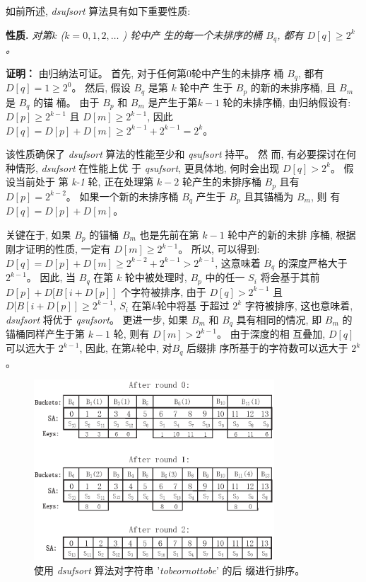 如前所述, \emph{dsufsort} 算法具有如下重要性质:


\textbf{性质.} \emph{对第$k$ \emph{(}$k = 0,1,2,\dots$ \emph{)} 轮中产
  生的每一个未排序的桶 $B_q$, 都有 $D[q] \geq 2^k$。}


\textbf{证明：} 由归纳法可证。 首先, 对于任何第0轮中产生的未排序
桶 $B_q$, 都有 $D[q] = 1 \geq 2^0$。  然后, 假设 $B_q$ 是第 $k$ 轮中产
生于 $B_p$ 的新的未排序桶, 且 $B_m$ 是 $B_q$ 的锚
桶。 由于 $B_p$ 和 $B_m$ 是产生于第$k-1$ 轮的未排序桶, 由归纳假设有:
$D[p] \geq 2^{k-1}$ 且 $D[m] \geq 2^{k-1}$, 因此
$D[q] = D[p] + D[m] \geq 2^{k-1} + 2^{k-1} = 2^k$。


该性质确保了 \emph{dsufsort} 算法的性能至少和 \emph{qsufsort} 持平。 然
而, 有必要探讨在何种情形, \emph{dsufsort} 在性能上优
于 \emph{qsufsort}, 更具体地, 何时会出现 $D[q] > 2^k$。 假设当前处于
第 \emph{k-1} 轮, 正在处理第 $k-2$ 轮产生的未排序桶 $B_p$ 且有 $D[p] =
2^{k-2}$。 如果一个新的未排序桶 $B_q$ 产生于 $B_p$ 且其锚桶为 $B_m$, 则
有 $D[q] = D[p] + D[m]$。

关键在于, 如果 $B_p$ 的锚桶 $B_m$ 也是先前在第 $k-1$ 轮中产的新的未排
序桶, 根据刚才证明的性质, 一定有 $D[m] \geq 2^{k-1}$。 所以, 可以得到:
$D[q] = D[p] + D[m] \geq 2^{k-2} + 2^{k-1} > 2^{k-1}$, 这意味着 $B_q$
的深度严格大于 $2^{k-1}$。 因此, 当 $B_q$ 在第 $k$ 轮中被处理时, $B_p$
中的任一 $S_i$ 将会基于其前 $D[p] + D[B[i+D[p]]$ 个字符被排序, 由于
$D[q] > 2^{k-1}$ 且 $D[B[i+D[p]] \geq 2^{k-1}$, $S_i$ 在第$k$轮中将基
于超过 $2^k$ 字符被排序, 这也意味着, \emph{dsufsort} 将优于
\emph{qsufsort}。 更进一步, 如果 $B_m$ 和 $B_q$ 具有相同的情况, 即
$B_m$ 的锚桶同样产生于第 $k-1$ 轮, 则有 $D[m] > 2^{k-1}$。 由于深度的相
互叠加, $D[q]$ 可以远大于 $2^{k-1}$, 因此, 在第$k$轮中, 对$B_q$ 后缀排
序所基于的字符数可以远大于 $2^k$。

\begin{figure}[!h]
\centering
\includegraphics[width=9cm]{figures/3_SS/p1}
\vspace*{8pt}
\caption{使用 \emph{dsufsort} 算法对字符串 '\emph{tobeornottobe}' 的后
  缀进行排序。}
\label{fig:1}
\end{figure}

